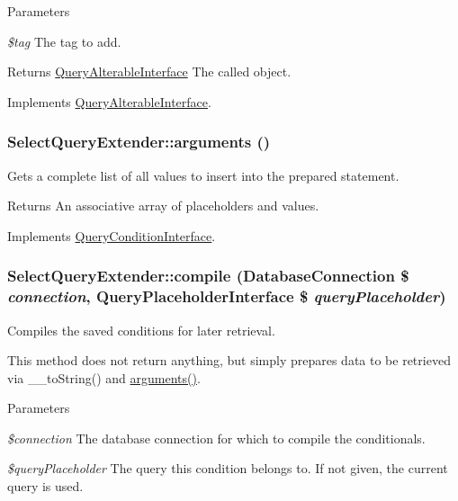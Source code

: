 \begin{DoxyParams}{Parameters}
\item[{\em \$tag}]The tag to add.\end{DoxyParams}
\begin{DoxyReturn}{Returns}
\hyperlink{interfaceQueryAlterableInterface}{QueryAlterableInterface} The called object. 
\end{DoxyReturn}


Implements \hyperlink{interfaceQueryAlterableInterface_a86b5a64d7b1b34959666e9d5eada3940}{QueryAlterableInterface}.\hypertarget{classSelectQueryExtender_a7095c455524c42ec48e49719ecc53d0c}{
\subsubsection[{arguments}]{\setlength{\rightskip}{0pt plus 5cm}SelectQueryExtender::arguments ()}}
\label{classSelectQueryExtender_a7095c455524c42ec48e49719ecc53d0c}
Gets a complete list of all values to insert into the prepared statement.

\begin{DoxyReturn}{Returns}
An associative array of placeholders and values. 
\end{DoxyReturn}


Implements \hyperlink{interfaceQueryConditionInterface_ac2349e02d5332412182cf472ba1a1b1e}{QueryConditionInterface}.\hypertarget{classSelectQueryExtender_af0ccde59737751f63dfb1743798a45ab}{
\subsubsection[{compile}]{\setlength{\rightskip}{0pt plus 5cm}SelectQueryExtender::compile ({\bf DatabaseConnection} \$ {\em connection}, \/  {\bf QueryPlaceholderInterface} \$ {\em queryPlaceholder})}}
\label{classSelectQueryExtender_af0ccde59737751f63dfb1743798a45ab}
Compiles the saved conditions for later retrieval.

This method does not return anything, but simply prepares data to be retrieved via \_\-\_\-toString() and \hyperlink{classSelectQueryExtender_a7095c455524c42ec48e49719ecc53d0c}{arguments()}.


\begin{DoxyParams}{Parameters}
\item[{\em \$connection}]The database connection for which to compile the conditionals. \item[{\em \$queryPlaceholder}]The query this condition belongs to. If not given, the current query is used. \end{DoxyParams}


